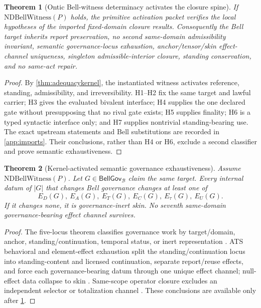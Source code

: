 \documentclass[11pt]{article}
\newtheorem{theorem}{Theorem}[section]
\theoremstyle{definition}
\newcommand{\Bell}{\mathcal{B}}
\newcommand{\NDBell}{\mathrm{NDBellWitness}}
\newcommand{\BellGov}{\mathsf{BellGov}_{\Bell}}
\begin{document}
\begin{theorem}[Ontic Bell-witness determinacy activates the closure spine]\label{thm:ndbellkernel}
If $\NDBell(P)$ holds, the primitive activation packet verifies the local hypotheses of the imported fixed-domain closure results. Consequently the Bell target inherits report preservation, no second same-domain admissibility invariant, semantic governance-locus exhaustion, anchor/tensor/skin effect-channel uniqueness, singleton admissible-interior closure, standing conservation, and no same-act repair.
\end{theorem}
\begin{proof}
By \cref{thm:adequacykernel}, the instantiated witness activates reference, standing, admissibility, and irreversibility. H1--H2 fix the same target and lawful carrier; H3 gives the evaluated bivalent interface; H4 supplies the one declared gate without presupposing that no rival gate exists; H5 supplies finality; H6 is a typed syntactic interface only; and H7 supplies nontrivial standing-bearing use. The exact upstream statements and Bell substitutions are recorded in \cref{app:imports}. Their conclusions, rather than H4 or H6, exclude a second classifier and prove semantic exhaustiveness.
\end{proof}

\begin{theorem}[Kernel-activated semantic governance exhaustiveness]\label{thm:semanticfactorization}
Assume $\NDBell(P)$. Let $G\in\BellGov$ claim the same target. Every internal datum of $|G|$ that changes Bell governance changes at least one of
\[
E_D(G),\ E_A(G),\ E_T(G),\ E_C(G),\ E_{\tau}(G),\ E_U(G).
\]
If it changes none, it is governance-inert skin. No seventh same-domain governance-bearing effect channel survives.
\end{theorem}
\begin{proof}
The five-locus theorem classifies governance work by target/domain, anchor, standing/continuation, temporal status, or inert representation \cite[Theorem~4.2]{MaleyBivalence2026}. ATS behavioral and element-effect exhaustion split the standing/continuation locus into standing-content and licensed continuation, separate report/reuse effects, and force each governance-bearing datum through one unique effect channel; null-effect data collapse to skin \cite[Theorems~4A, 4C, 4D, 5, 5A, and 5C]{MaleyATS2026}. Same-scope operator closure excludes an independent selector or totalization channel \cite{MaleySameScope2026}. These conclusions are available only after \cref{thm:ndbellkernel}.
\end{proof}
\end{document}
